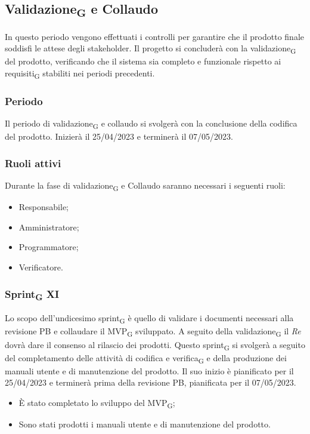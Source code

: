 \newpage
\subsection{Validazione\textsubscript{G} e Collaudo}
In questo periodo vengono effettuati i controlli per garantire che il prodotto finale soddisfi le attese degli stakeholder. Il progetto si concluderà con la validazione\textsubscript{G} del prodotto, verificando che il sistema sia completo e funzionale rispetto ai requisiti\textsubscript{G} stabiliti nei periodi precedenti.

\subsubsection{Periodo}
Il periodo di validazione\textsubscript{G} e collaudo si svolgerà con la conclusione della codifica del prodotto. Inizierà il 25/04/2023 e terminerà il 07/05/2023.

\subsubsection{Ruoli attivi}
Durante la fase di validazione\textsubscript{G} e Collaudo saranno necessari i seguenti ruoli:
\begin{itemize}
	\item Responsabile;
	\item Amministratore;
	\item Programmatore;
	\item Verificatore.
\end{itemize}

\subsubsection{Sprint\textsubscript{G} XI}
Lo scopo dell'undicesimo sprint\textsubscript{G} è quello di validare i documenti necessari alla revisione PB e collaudare il MVP\textsubscript{G} sviluppato. A seguito della validazione\textsubscript{G} il \textit{Re} dovrà dare il consenso al rilascio dei prodotti.
Questo sprint\textsubscript{G} si svolgerà a seguito del completamento delle attività di codifica e verifica\textsubscript{G} e della produzione dei manuali utente e di manutenzione del prodotto. Il suo inizio è pianificato per il 25/04/2023 e terminerà prima della revisione PB, pianificata per il 07/05/2023.

\:
\begin{itemize}
	\item È stato completato lo sviluppo del MVP\textsubscript{G};
	\item Sono stati prodotti i manuali utente e di manutenzione del prodotto.
\end{itemize}

